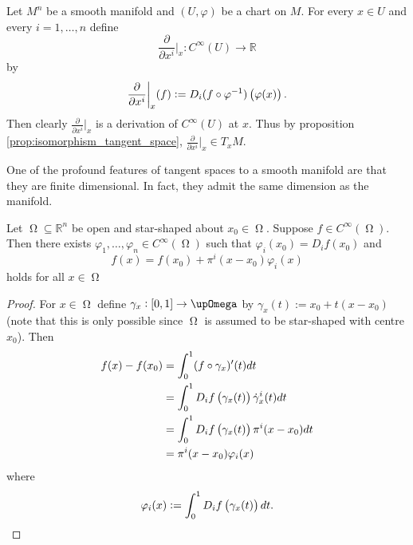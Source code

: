 \begin{example}
	Let $M^n$ be a smooth manifold and $(U,\varphi)$ be a chart on $M$. For every $x \in U$ and every $i = 1,\dots,n$ define 
	\begin{equation*}
		\frac{\partial}{\partial x^i}\bigg\vert_x : C^\infty(U) \to \mathbb{R}
	\end{equation*}
	\noindent by
	\begin{equation*}
		\frac{\partial}{\partial x^i}\bigg\vert_x(f) := D_i(f \circ \varphi^{-1})\del[1]{\varphi(x)}.
	\end{equation*}
	Then clearly $\frac{\partial}{\partial x^i}\big\vert_x$ is a derivation of $C^\infty(U)$ at $x$. Thus by proposition \ref{prop:isomorphism_tangent_space}, $\frac{\partial}{\partial x^i}\big\vert_x \in T_xM$. 
\end{example}

One of the profound features of tangent spaces to a smooth manifold are that they are finite dimensional. In fact, they admit the same dimension as the manifold.

\begin{lemma}
	\label{lem:star_shaped}
	Let $\upOmega \subseteq \mathbb{R}^n$ be open and star-shaped about $x_0 \in \upOmega$. Suppose $f \in C^\infty(\upOmega)$. Then there exists $\varphi_1,\dots,\varphi_n \in C^\infty(\upOmega)$ such that $\varphi_i(x_0) = D_if(x_0)$ and
	\begin{equation*}
		f(x) = f(x_0) + \pi^i(x - x_0) \varphi_i(x)
	\end{equation*}
	\noindent holds for all $x \in \upOmega$
\end{lemma}

\begin{proof}
	For $x \in \upOmega$ define $\gamma_x : \intcc{0,1} \to \upOmega$ by $\gamma_x(t) := x_0 + t(x - x_0)$ (note that this is only possible since $\upOmega$ is assumed to be star-shaped with centre $x_0$). Then
	\begin{align*}
		f(x) - f(x_0) &= \int_0^1 (f \circ \gamma_x)'(t) dt\\
		&= \int_0^1 D_if\del[1]{\gamma_x(t)} \dot{\gamma}^i_x(t) dt\\
		&= \int_0^1 D_if\del[1]{\gamma_x(t)} \pi^i(x - x_0)dt\\
		&= \pi^i(x - x_0)\varphi_i(x)
	\end{align*}
	\noindent where
	\begin{equation*}
		\varphi_i(x) := \int_0^1 D_if\del[1]{\gamma_x(t)} dt.
	\end{equation*}
\end{proof}

